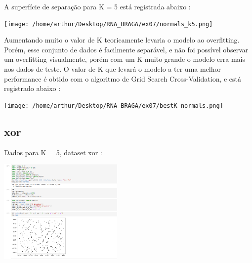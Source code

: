 \documentclass{article}
\begin{document}
\vspace{10pt}

A superfície de separação para K = 5 está registrada abaixo : 

\vspace{10pt}

\begin{center}

\texttt{[image: /home/arthur/Desktop/RNA\_BRAGA/ex07/normals\_k5.png]}
            
\end{center}

\vspace{10pt}

Aumentando muito o valor de K teoricamente levaria o modelo ao overfitting. Porém, esse conjunto de dados é facilmente separável, e não foi possível observar um overfitting visualmente, porém com um K muito grande o modelo erra mais nos dados de teste. O valor de K que levará o modelo a ter uma melhor performance é obtido com o algoritmo de Grid Search Cross-Validation, e está registrado abaixo : 

\vspace{10pt}

\begin{center}

\texttt{[image: /home/arthur/Desktop/RNA\_BRAGA/ex07/bestK\_normals.png]}
            
\end{center}



\vspace{20pt}



\subsection{xor}

\vspace{10pt}

Dados para K = 5, dataset xor : 

\vspace{10pt}

\begin{center}

\includegraphics[height=2in]{xor_data.png}
    
\end{center}
\end{document}

